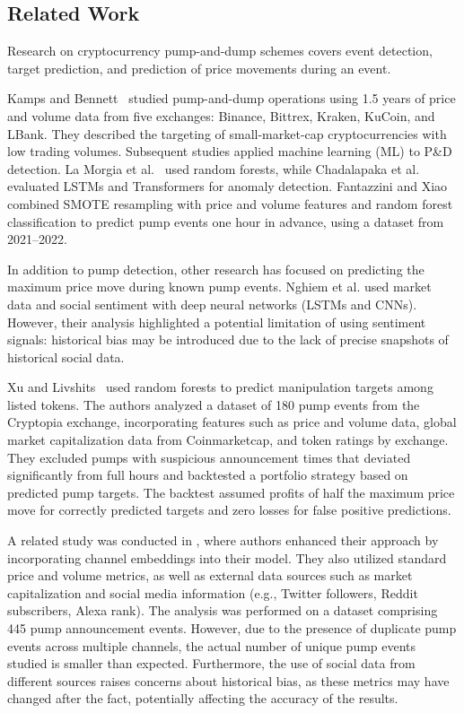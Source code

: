 \documentclass{ieeeaccess}
\begin{document}
\subsection{Related Work}

Research on cryptocurrency pump-and-dump schemes covers event detection, target prediction, and prediction of price movements during an event.

Kamps and Bennett~\cite{kamps_moon_2018} studied pump-and-dump operations using 1.5 years of price and volume data from five exchanges: Binance, Bittrex, Kraken, KuCoin, and LBank. They described the targeting of small-market-cap cryptocurrencies with low trading volumes. Subsequent studies applied machine learning (ML) to P\&D detection. La Morgia et al.~\cite{la_morgia_pump_2020,la2023doge} used random forests, while Chadalapaka et al.~\cite{chadalapaka_crypto_2022} evaluated LSTMs and Transformers for anomaly detection.
Fantazzini and Xiao~\cite{econometrics11030022} combined SMOTE resampling with price and volume features and random forest classification to predict pump events one hour in advance, using a dataset from 2021--2022.

In addition to pump detection, other research has focused on predicting the maximum price move during known pump events. Nghiem et al. \cite{nghiem_2021} used market data and social sentiment with deep neural networks (LSTMs and CNNs). However, their analysis highlighted a potential limitation of using sentiment signals: historical bias may be introduced due to the lack of precise snapshots of historical social data.

Xu and Livshits~\cite{pd_anatomy} used random forests to predict manipulation targets among listed tokens. The authors analyzed a dataset of 180 pump events from the Cryptopia exchange, incorporating features such as price and volume data, global market capitalization data from Coinmarketcap, and token ratings by exchange. They excluded pumps with suspicious announcement times that deviated significantly from full hours and backtested a portfolio strategy based on predicted pump targets. The backtest assumed profits of half the maximum price move for correctly predicted targets and zero losses for false positive predictions.

A related study was conducted in \cite{hu2023sequence}, where authors enhanced their approach by incorporating channel embeddings into their model. They also utilized standard price and volume metrics, as well as external data sources such as market capitalization and social media information (e.g., Twitter followers, Reddit subscribers, Alexa rank). The analysis was performed on a dataset comprising 445 pump announcement events. However, due to the presence of duplicate pump events across multiple channels, the actual number of unique pump events studied is smaller than expected. Furthermore, the use of social data from different sources raises concerns about historical bias, as these metrics may have changed after the fact, potentially affecting the accuracy of the results.
\end{document}
